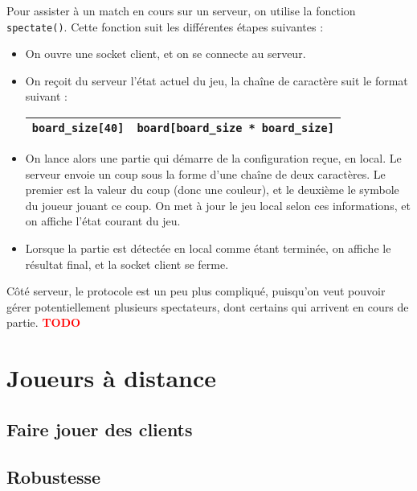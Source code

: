 \documentclass[a4paper]{article}
\newcommand{\TODO}{\textcolor{red}{\textbf{TODO}}}
\begin{document}
Pour assister à un match en cours sur un serveur, on utilise la fonction \texttt{spectate()}. Cette fonction suit les différentes étapes suivantes :

%
\begin{itemize}
	\setlength\itemsep{1em}
	\item On ouvre une socket client, et on se connecte au serveur.
	\item On reçoit du serveur l'état actuel du jeu, la chaîne de caractère suit le format suivant :

		\bgroup
		\def\arraystretch{1.5}
		\begin{center}
		\begin{tabular}{|c|c|}
			\hline 
			\texttt{board\_size[40]} & \texttt{board[board\_size * board\_size]} \\ 
			\hline 
		\end{tabular} 	
		\end{center}
		\egroup
	
	\item On lance alors une partie qui démarre de la configuration reçue, en local. Le serveur envoie un coup sous la forme d'une chaîne de deux caractères. Le premier est la valeur du coup (donc une couleur), et le deuxième le symbole du joueur jouant ce coup. On met à jour le jeu local selon ces informations, et on affiche l'état courant du jeu. 
	\item Lorsque la partie est détectée en local comme étant terminée, on affiche le résultat final, et la socket client se ferme. \\

\end{itemize}
%


Côté serveur, le protocole est un peu plus compliqué, puisqu'on veut pouvoir gérer potentiellement plusieurs spectateurs, dont certains qui arrivent en cours de partie.
\TODO


\section{Joueurs à distance}

\subsection{Faire jouer des clients}



\subsection{Robustesse}
\end{document}
